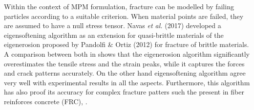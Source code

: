 \documentclass[preprint,12pt,a4paper]{elsarticle}
\begin{document}
Within the context of MPM formulation, fracture can be modelled by
failing particles according to a suitable criterion. When material
points are failed, they are assumed to have a null stress
tensor. Navas {\it et al.} (2017)\cite{Navas_2017_ES} developed a
eigensoftening algorithm as an extension for quasi-brittle materials
of the eigenerosion proposed by Pandolfi \& Ortiz
(2012)\cite{Pandolfi_2012} for fracture of brittle materials. A
comparison between both in \cite{Navas_2017_ES} shows that
the eigenerosion algorithm significantly overestimates the tensile
stress and the strain peaks, while it captures the forces and crack
patterns accurately. On the other hand eigensoftening algorithm agree
very well with experimental results in all the aspects. Furthermore,
this algorithm has also proof its accuracy for complex fracture
patters such the present in fiber reinforces concrete (FRC),
\cite{Navas_2018_ES}.\\
\end{document}
